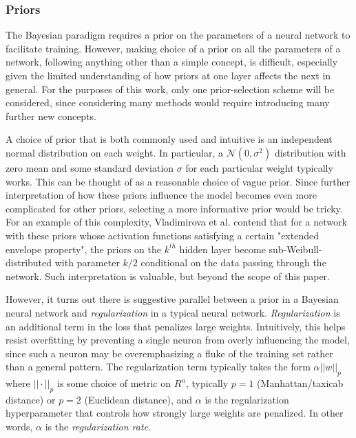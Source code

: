 \documentclass[12pt]{article}
\begin{document}
\subsubsection{Priors}
\label{subsection:priors}

The Bayesian paradigm requires a prior on the parameters of a neural network to facilitate training. However, making choice of a prior on all the parameters of a network, following anything other than a simple concept, is difficult, especially given the limited understanding of how priors at one layer affects the next in general. For the purposes of this work, only one prior-selection scheme will be considered, since considering many methods would require introducing many further new concepts. 

A choice of prior that is both commonly used and intuitive is an independent normal distribution on each weight. In particular, a $\mathcal{N}(0, \sigma^2)$ distribution with zero mean and some standard deviation $\sigma$ for each particular weight typically works. This can be thought of as a reasonable choice of vague prior. Since further interpretation of how these priors influence the model becomes even more complicated for other priors, selecting a more informative prior would be tricky. For an example of this complexity, Vladimirova et al. contend that for a network with these priors whose activation functions satisfying a certain "extended envelope property", the priors on the $k^{th}$ hidden layer become sub-Weibull-distributed with parameter $k/2$ conditional on the data passing through the network. Such interpretation is valuable, but beyond the scope of this paper.

However, it turns out there is suggestive parallel between a prior in a Bayesian neural network and \textit{regularization} in a typical neural network. \textit{Regularization} is an additional term in the loss that penalizes large weights. Intuitively, this helps resist overfitting by preventing a single neuron from overly influencing the model, since such a neuron may be overemphasizing a fluke of the training set rather than a general pattern. The regularization term typically takes the form $\alpha ||w||_p$  where $||\cdot||_p$ is some choice of metric on $R^n$, typically $p=1$ (Manhattan/taxicab distance) or $p=2$ (Euclidean distance), and $\alpha$ is the regularization hyperparameter that controls how strongly large weights are penalized. In other words, $\alpha$ is the \textit{regularization rate}. 
\end{document}

